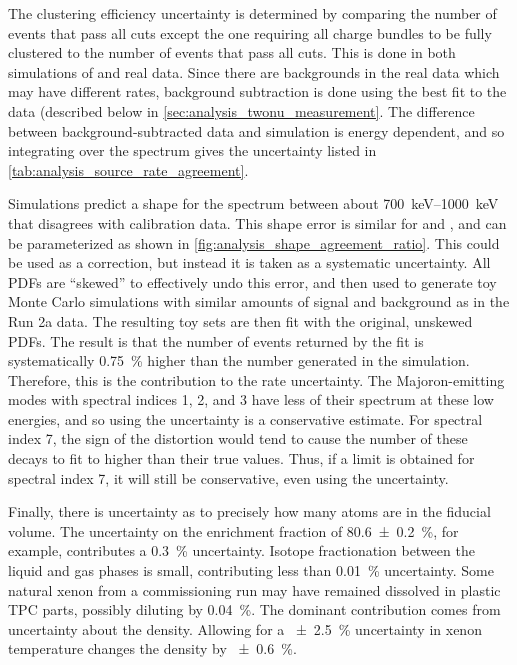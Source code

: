 \documentclass[herrin-thesis.tex]{subfiles}
\begin{document}
The clustering efficiency uncertainty is determined by comparing the number of events that pass all cuts except the one requiring all charge bundles to be fully clustered to the number of events that pass all cuts. This is done in both simulations of \twonu{} and real data. Since there are backgrounds in the real data which may have different rates, background subtraction is done using the best fit to the data (described below in \cref{sec:analysis_twonu_measurement}. The difference between background-subtracted data and simulation is energy dependent, and so integrating over the \twonu{} spectrum gives the uncertainty listed in \cref{tab:analysis_source_rate_agreement}.

Simulations predict a shape for the spectrum between about \SIrange{700}{1000}{\keV} that disagrees with calibration data. This shape error is similar for  and , and can be parameterized as shown in \cref{fig:analysis_shape_agreement_ratio}. This could be used as a correction, but instead it is taken as a systematic uncertainty. All PDFs are ``skewed'' to effectively undo this error, and then used to generate toy Monte Carlo simulations with similar amounts of signal and background as in the Run 2a data. The resulting toy sets are then fit with the original, unskewed PDFs. The result is that the number of \twonu{} events returned by the fit is systematically \SI{0.75}{\percent} higher than the number generated in the simulation. Therefore, this is the contribution to the \twonu{} rate uncertainty. The Majoron-emitting modes with spectral indices 1, 2, and 3 have less of their spectrum at these low energies, and so using the \twonu{} uncertainty is a conservative estimate. For spectral index 7, the sign of the distortion would tend to cause the number of these decays to fit to higher than their true values. Thus, if a limit is obtained for spectral index 7, it will still be conservative, even using the \twonu{} uncertainty.

Finally, there is uncertainty as to precisely how many  atoms are in the fiducial volume. The uncertainty on the enrichment fraction of \SI{80.6\pm0.2}{\percent}, for example, contributes a \SI{0.3}{\percent} uncertainty. Isotope fractionation between the liquid and gas phases is small, contributing less than \SI{0.01}{\percent} uncertainty. Some natural xenon from a commissioning run may have remained dissolved in plastic TPC parts, possibly diluting  by \SI{0.04}{\percent}. The dominant contribution comes from uncertainty about the density. Allowing for a \SI{\pm2.5}{\percent} uncertainty in xenon temperature changes the density by \SI{\pm0.6}{\percent}.
\end{document}
